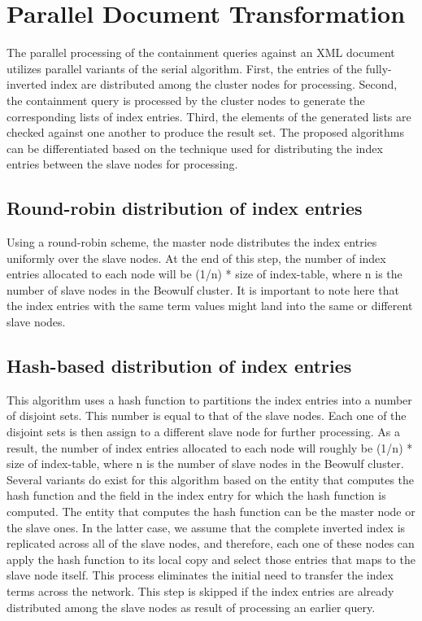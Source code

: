 \section{Parallel Document Transformation}
The parallel processing of the containment queries against an XML document utilizes parallel variants of the serial algorithm. First, the entries of the fully-inverted index are distributed among the cluster nodes for processing. Second, the containment query is processed by the cluster nodes to generate the corresponding lists of index entries. Third, the elements of the generated lists are checked against one another to produce the result set. The proposed algorithms can be differentiated based on the technique used for distributing the index entries between the slave nodes for processing.
\subsection{Round-robin distribution of index entries}
Using a round-robin scheme, the master node distributes the index entries uniformly over the slave nodes. At the end of this step, the number of index entries allocated to each node will be (1/n) * size of index-table, where n is the number of slave nodes in the Beowulf cluster. It is important to note here that the index entries with the same term values might land 
into the same or different slave nodes.
\subsection{Hash-based distribution of index entries}
This algorithm uses a hash function to partitions the index entries into a number of disjoint sets. This number is equal to that of the slave nodes. Each one of the disjoint sets is then assign to a different slave node for further processing. As a result, the number of index entries allocated to each node will roughly be (1/n) * size of index-table, where n is the number of slave nodes in the Beowulf cluster. Several variants do exist for this algorithm based on the entity that computes the hash function and the field in the index entry for which the hash function is computed. The entity that computes the hash function can be the master node or the slave ones. In the latter case, we assume that the complete inverted index is replicated across all of the slave nodes, and therefore, each one of these nodes can apply the hash function to its local copy and select those entries that maps to the slave node itself. This process eliminates the initial need to transfer the index terms across the network. This step is skipped if the index entries are already distributed among the slave nodes as result of processing an earlier query.
\subsection{}
